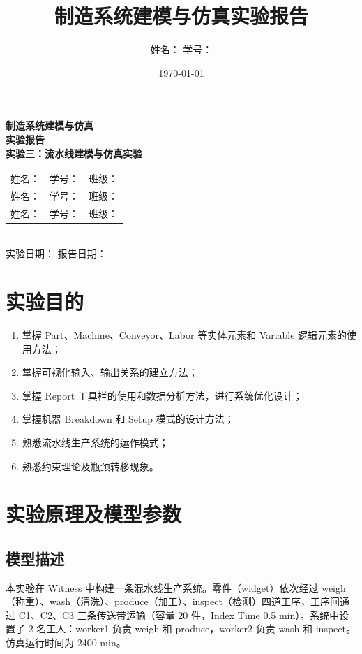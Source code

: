 \documentclass[12pt, a4paper, UTF8]{ctexart}
\title{\heiti\zihao{2}制造系统建模与仿真实验报告}
\author{\kaishu\zihao{4}姓名：\underline{\qquad\qquad} \quad 学号：\underline{\qquad\qquad}}
\date{\kaishu\zihao{4}\today}
\begin{document}
\begin{titlepage}
    \centering
    \vspace*{2cm}
    {\heiti{}\textbf{制造系统建模与仿真}\\[0.5cm]
    \textbf{实验报告}}\\[2cm]
    {\kaishu{}\textbf{实验三：流水线建模与仿真实验}}\\[3cm]
    {\songti{}
    \begin{tabular}{lll}
        姓名：\underline{\qquad\qquad\qquad} &
        学号：\underline{\qquad\qquad\qquad} &
        班级：\underline{\qquad\qquad\qquad} \\[0.8cm]
        姓名：\underline{\qquad\qquad\qquad} &
        学号：\underline{\qquad\qquad\qquad} &
        班级：\underline{\qquad\qquad\qquad} \\[0.8cm]
        姓名：\underline{\qquad\qquad\qquad} &
        学号：\underline{\qquad\qquad\qquad} &
        班级：\underline{\qquad\qquad\qquad} \\
    \end{tabular}\\[1.5cm]
    实验日期：\underline{\qquad\qquad\qquad} \quad
    报告日期：\underline{\qquad\qquad\qquad}
    }
    \vfill
\end{titlepage}

\section{实验目的}
\begin{enumerate}
    \item 掌握 Part、Machine、Conveyor、Labor 等实体元素和 Variable 逻辑元素的使用方法；
    \item 掌握可视化输入、输出关系的建立方法；
    \item 掌握 Report 工具栏的使用和数据分析方法，进行系统优化设计；
    \item 掌握机器 Breakdown 和 Setup 模式的设计方法；
    \item 熟悉流水线生产系统的运作模式；
    \item 熟悉约束理论及瓶颈转移现象。
\end{enumerate}

\section{实验原理及模型参数}
\subsection{模型描述}
本实验在 Witness 中构建一条混水线生产系统。零件（widget）依次经过 weigh（称重）、wash（清洗）、produce（加工）、inspect（检测）四道工序，工序间通过 C1、C2、C3 三条传送带运输（容量 20 件，Index Time 0.5 min）。系统中设置了 2 名工人：worker1 负责 weigh 和 produce，worker2 负责 wash 和 inspect。仿真运行时间为 2400 min。
\end{document}
